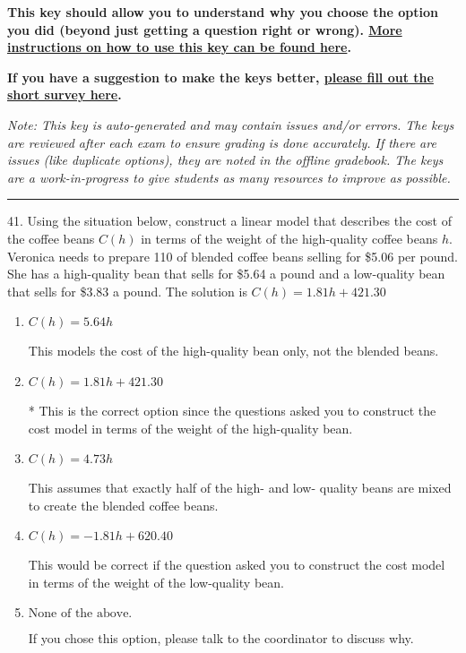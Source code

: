 \documentclass{extbook}[14pt]
\begin{document}
\textbf{This key should allow you to understand why you choose the option you did (beyond just getting a question right or wrong). \href{https://xronos.clas.ufl.edu/mac1105spring2020/courseDescriptionAndMisc/Exams/LearningFromResults}{More instructions on how to use this key can be found here}.}

\textbf{If you have a suggestion to make the keys better, \href{https://forms.gle/CZkbZmPbC9XALEE88}{please fill out the short survey here}.}

\textit{Note: This key is auto-generated and may contain issues and/or errors. The keys are reviewed after each exam to ensure grading is done accurately. If there are issues (like duplicate options), they are noted in the offline gradebook. The keys are a work-in-progress to give students as many resources to improve as possible.}

\rule{\textwidth}{0.4pt}

41. Using the situation below, construct a linear model that describes the cost of the coffee beans $C(h)$ in terms of the weight of the high-quality coffee beans $h$.
Veronica needs to prepare 110 of blended coffee beans selling for \$5.06 per pound. She has a high-quality bean that sells for \$5.64 a pound and a low-quality bean that sells for \$3.83 a pound. 
The solution is $ C(h) = 1.81 h + 421.30 $ 

\begin{enumerate}[label=\Alph*.] 
\item $ C(h) = 5.64 h $ 

 This models the cost of the high-quality bean only, not the blended beans. 
\item $ C(h) = 1.81 h + 421.30 $ 

 * This is the correct option since the questions asked you to construct the cost model in terms of the weight of the high-quality bean. 
\item $ C(h) = 4.73 h $ 

 This assumes that exactly half of the high- and low- quality beans are mixed to create the blended coffee beans. 
\item $ C(h) = -1.81 h + 620.40 $ 

 This would be correct if the question asked you to construct the cost model in terms of the weight of the low-quality bean. 
\item $ \text{None of the above.} $ 

 If you chose this option, please talk to the coordinator to discuss why. 
\end{enumerate} 
 
\end{document}
